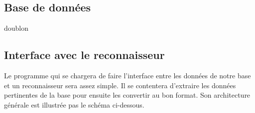 \paragraph{}
\begin{mdframed}[frametitle={Titre}, innerbottommargin=10]
\begin{center}
\end{center}
\end{mdframed}

\subsection{Base de données}

doublon

\paragraph{}
\begin{mdframed}[frametitle={Titre}, innerbottommargin=10]
\begin{center}
\end{center}
\end{mdframed}

\subsection{Interface avec le reconnaisseur}

Le programme qui se chargera de faire l’interface entre les données de notre
base et un reconnaisseur sera assez simple. Il se contentera d’extraire les
données pertinentes de la base pour ensuite les convertir au bon format. Son
architecture générale est illustrée pas le schéma ci-dessous.

\paragraph{}
\begin{mdframed}[frametitle={Titre}, innerbottommargin=10]
\begin{center}
\end{center}
\end{mdframed}

